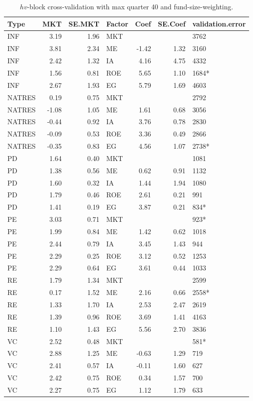 \documentclass[12pt]{article}
\begin{document}
\begin{table}[ht]
	\centering
	\begin{tabular}{lrrlrrl}
		Type & MKT & SE.MKT & Factor & Coef & SE.Coef & validation.error \\ 
		\hline
		\hline
		INF & 3.19 & 1.96 & MKT &  &  & 3762 \\ 
		INF & 3.81 & 2.34 & ME & -1.42 & 1.32 & 3160 \\ 
		INF & 2.42 & 1.32 & IA & 4.16 & 4.75 & 4332 \\ 
		INF & 1.56 & 0.81 & ROE & 5.65 & 1.10 & 1684* \\ 
		INF & 2.67 & 1.93 & EG & 5.79 & 1.69 & 4603 \\ 
		\hline
		NATRES & 0.19 & 0.75 & MKT &  &  & 2792 \\ 
		NATRES & -1.08 & 1.05 & ME & 1.61 & 0.68 & 3056 \\ 
		NATRES & -0.44 & 0.92 & IA & 3.76 & 0.78 & 2830 \\ 
		NATRES & -0.09 & 0.53 & ROE & 3.36 & 0.49 & 2866 \\ 
		NATRES & -0.35 & 0.83 & EG & 4.56 & 1.07 & 2738* \\ 
		\hline
		PD & 1.64 & 0.40 & MKT &  &  & 1081 \\ 
		PD & 1.38 & 0.56 & ME & 0.62 & 0.91 & 1132 \\ 
		PD & 1.60 & 0.32 & IA & 1.44 & 1.94 & 1080 \\ 
		PD & 1.79 & 0.46 & ROE & 2.61 & 0.21 & 991 \\ 
		PD & 1.41 & 0.19 & EG & 3.87 & 0.21 & 834* \\ 
		\hline
		PE & 3.03 & 0.71 & MKT &  &  & 923* \\ 
		PE & 1.99 & 0.84 & ME & 1.42 & 0.62 & 1018 \\ 
		PE & 2.44 & 0.79 & IA & 3.45 & 1.43 & 944 \\ 
		PE & 2.29 & 0.25 & ROE & 3.12 & 0.52 & 1253 \\ 
		PE & 2.29 & 0.64 & EG & 3.61 & 0.44 & 1033 \\ 
		\hline
		RE & 1.79 & 1.34 & MKT &  &  & 2599 \\ 
		RE & 0.17 & 1.52 & ME & 2.16 & 0.66 & 2558* \\ 
		RE & 1.33 & 1.70 & IA & 2.53 & 2.47 & 2619 \\ 
		RE & 1.39 & 0.96 & ROE & 3.69 & 1.41 & 4163 \\ 
		RE & 1.10 & 1.43 & EG & 5.56 & 2.70 & 3836 \\ 
		\hline
		VC & 2.52 & 0.48 & MKT &  &  & 581* \\ 
		VC & 2.88 & 1.25 & ME & -0.63 & 1.29 & 719 \\ 
		VC & 2.41 & 0.57 & IA & -0.11 & 1.60 & 627 \\ 
		VC & 2.42 & 0.75 & ROE & 0.34 & 1.57 & 700 \\ 
		VC & 2.27 & 0.75 & EG & 1.12 & 1.79 & 633 \\ 
		\hline
		\hline
	\end{tabular}
	\caption{$hv$-block cross-validation with max quarter 40 and fund-size-weighting.}
	\label{tab:cv_40_fw_dep}
\end{table}
\end{document}
